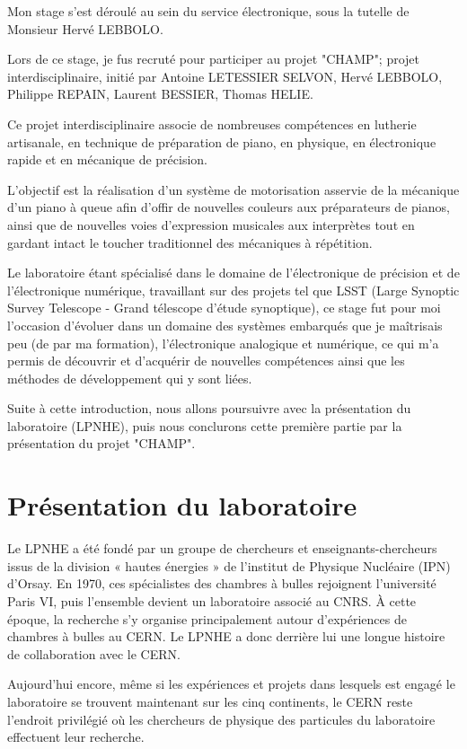\documentclass[french,a4paper,12pt]{report}
\begin{document}
Mon stage s'est déroulé au sein du service électronique, sous la tutelle de Monsieur Hervé LEBBOLO.

Lors de ce stage, je fus recruté pour participer au projet "CHAMP"; projet interdisciplinaire, initié par Antoine LETESSIER SELVON, Hervé LEBBOLO, Philippe REPAIN, Laurent BESSIER, Thomas HELIE.

Ce projet interdisciplinaire associe de nombreuses compétences en lutherie artisanale, en technique de préparation de piano, en physique, en électronique rapide et en mécanique de précision.

L'objectif est la réalisation d'un système de motorisation asservie de la mécanique d'un piano à queue afin d'offir de nouvelles couleurs aux préparateurs de pianos, ainsi que de nouvelles voies d'expression musicales aux interprètes tout en gardant intact le toucher traditionnel des mécaniques à répétition.

Le laboratoire étant spécialisé dans le domaine de l'électronique de précision et de l'électronique numérique, travaillant sur des projets tel que LSST (Large Synoptic Survey Telescope - Grand télescope d'étude synoptique), ce stage fut pour moi l'occasion d'évoluer dans un domaine des systèmes embarqués que je maîtrisais peu (de par ma formation), l'électronique analogique et numérique, ce qui m'a permis de découvrir et d'acquérir de nouvelles compétences ainsi que les méthodes de développement qui y sont liées.

Suite à cette introduction, nous allons poursuivre avec la présentation du laboratoire (LPNHE), puis nous conclurons cette première partie par la présentation du projet "CHAMP".


  
	\chapter{Présentation du laboratoire}
  Le LPNHE a été fondé par un groupe de chercheurs et enseignants-chercheurs issus de la division « hautes énergies » de l’institut de Physique Nucléaire (IPN) d’Orsay. En 1970, ces spécialistes des chambres à bulles rejoignent l’université Paris VI, puis l’ensemble devient un laboratoire associé au CNRS. À cette époque, la recherche s’y organise principalement autour d’expériences de chambres à bulles au CERN. Le LPNHE a donc derrière lui une longue histoire de collaboration avec le CERN.
  
  Aujourd’hui encore, même si les expériences et projets dans lesquels est engagé le laboratoire se trouvent maintenant sur les cinq continents, le CERN reste l’endroit privilégié où les chercheurs de physique des particules du laboratoire effectuent leur recherche.
  
\end{document}
